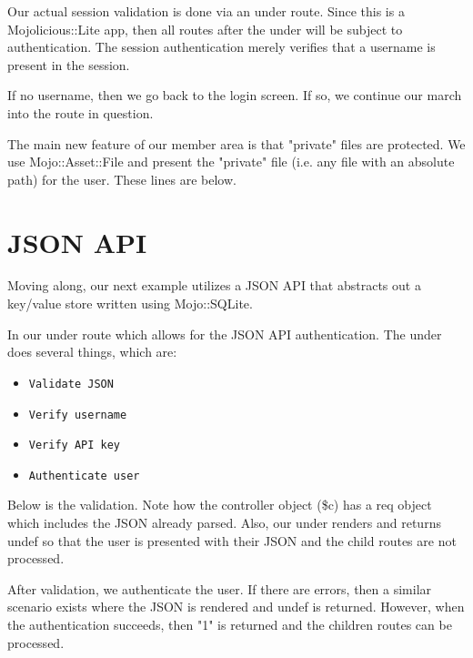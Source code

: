 \documentclass[14pt]{extreport}
\begin{document}
Our actual session validation is done via an under route.  Since this is a
Mojolicious::Lite app, then all routes after the under will be subject to
authentication.  The session authentication merely verifies that a username is
present in the session.

If no username, then we go back to the login screen.  If so, we continue our
march into the route in question.



The main new feature of our member area is that "private" files are protected.
We use Mojo::Asset::File and present the "private" file (i.e. any file with an
absolute path) for the user.  These lines are below.



\section{JSON API}

Moving along, our next example utilizes a JSON API that abstracts out a
key/value store written using Mojo::SQLite.

In our under route which allows for the JSON API authentication.  The under
does several things, which are:

\begin{itemize} \itemsep1pt \parskip0pt 
\item \verb|Validate JSON|
\item \verb|Verify username|
\item \verb|Verify API key|
\item \verb|Authenticate user|
\end{itemize}

Below is the validation.  Note how the controller object (\$c) has a req object
which includes the JSON already parsed.  Also, our under renders and returns
undef so that the user is presented with their JSON and the child routes are
not processed.



\clearpage

After validation, we authenticate the user.  If there are errors, then a
similar scenario exists where the JSON is rendered and undef is returned.
However, when the authentication succeeds, then "1" is returned and the 
children routes can be processed.
\end{document}
